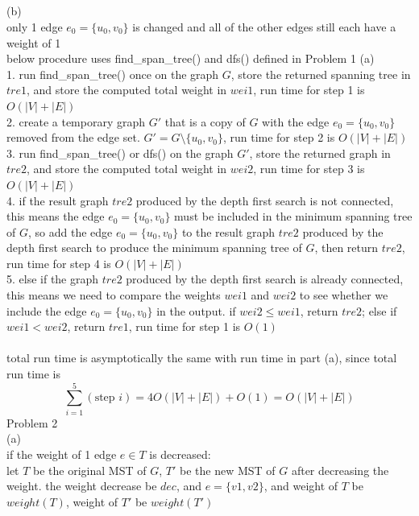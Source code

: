 \documentclass[12pt,border=4pt,multi]{article} %
\begin{document}
\leavevmode
\\
\\
\\
\\
(b)\\
only 1 edge $e_0 = \{u_0, v_0\}$ is changed and all of the other edges still each have a weight of 1\\
below procedure uses find\_span\_tree() and dfs() defined in Problem 1 (a)\\
1. run find\_span\_tree() once on the graph $G$, store the returned spanning tree in $tre1$, and store the computed total weight in $wei1$, run time for step 1 is $O(|V| + |E|)$\\
2. create a temporary graph $G'$ that is a copy of $G$ with the edge $e_0 = \{u_0, v_0\}$ removed from the edge set. $G' = G \setminus \{u_0, v_0\}$, run time for step 2 is $O(|V| + |E|)$\\
3. run find\_span\_tree() or dfs() on the graph $G'$, store the returned graph in $tre2$, and store the computed total weight in $wei2$, run time for step 3 is $O(|V| + |E|)$\\
4. if the result graph $tre2$ produced by the depth first search is not connected, this means the edge $e_0 = \{u_0, v_0\}$ must be included in the minimum spanning tree of $G$, so add the edge $e_0 = \{u_0, v_0\}$ to the result graph $tre2$ produced by the depth first search to produce the minimum spanning tree of $G$, then return $tre2$, run time for step 4 is $O(|V| + |E|)$\\
5. else if the graph $tre2$ produced by the depth first search is already connected, this means we need to compare the weights $wei1$ and $wei2$ to see whether we include the edge $e_0 = \{u_0, v_0\}$ in the output. if $wei2 \leq wei1$, return $tre2$; else if $wei1 < wei2$, return $tre1$, run time for step 1 is $O(1)$\\
\\
total run time is asymptotically the same with run time in part (a), since total run time is
\[\sum_{i = 1}^5(\text{step } i) = 4O(|V| + |E|) + O(1) = O(|V| + |E|)\]
\newpage
\noindent
Problem 2\\
(a)\\
if the weight of 1 edge $e \in T$ is decreased:\\
let $T$ be the original MST of $G$, $T'$ be the new MST of $G$ after decreasing the weight. the weight decrease be $dec$, and $e = \{v1, v2\}$, and weight of $T$ be $weight(T)$, weight of $T'$ be $weight(T')$\\
\end{document}
